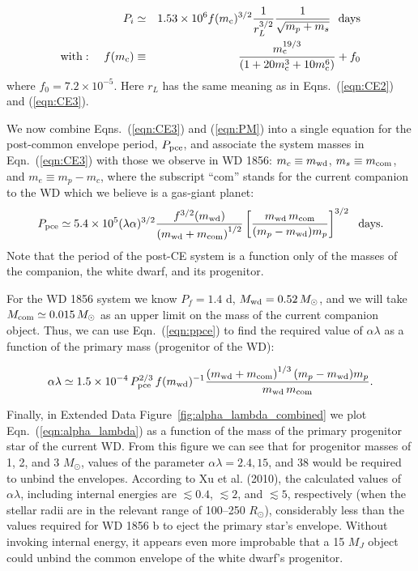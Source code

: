 \documentclass{nature3}
\begin{document}
\begin{methods}
\begin{eqnarray}
P_i  & \simeq & 1.53 \times 10^6 f(m_{\rm c})^{3/2}  \frac{1}{r_L^{3/2}}\frac{1}{\sqrt{m_p+m_s}} ~~{\rm days} \label{eqn:PM} \\
{\rm with:} ~~~~f(m_{\rm c}) & \equiv & \frac{m_{\rm c}^{19/3}}{(1+20m_{\rm c}^3 +10 m_{\rm c}^6)}+f_0  \nonumber
\label{eqn:pinit}
\end{eqnarray}
where $f_0 = 7.2\times 10^{-5}$.  Here $r_L$ has the same meaning as in Eqns.~(\ref{eqn:CE2}) and (\ref{eqn:CE3}).

We now combine Eqns.~(\ref{eqn:CE3}) and (\ref{eqn:PM}) into a single equation for the post-common envelope period, $P_{\rm pce}$, and associate the system masses in Eqn.~(\ref{eqn:CE3}) with those we observe in WD 1856: $m_c \equiv m_{\rm wd}$, $m_s \equiv m_{\rm com}$, and $m_e \equiv m_p - m_c$, where the subscript ``com'' stands for the current companion to the WD which we believe is a gas-giant planet: 
\begin{equation}
P_{\rm pce}  \simeq  5.4 \times 10^5 (\lambda \alpha)^{3/2}  \frac{f^{3/2}(m_{\rm wd})}{\left(m_{\rm wd}+m_{\rm com}\right)^{1/2}}
 \left[\frac{m_{\rm wd}\,m_{\rm com}}{(m_p-m_{\rm wd}) m_p}\right]^{3/2}    ~~{\rm days}.  
\label{eqn:ppce}
\end{equation}
Note that the period of the post-CE system is a function only of the masses of the companion, the white dwarf, and its progenitor.

For the WD 1856 system we know $P_f = 1.4$ d, $M_{\rm wd} = 0.52 \, M_\odot$, and we will take $M_{\rm com} \simeq 0.015 \,M_\odot$ as an upper limit on the mass of the current companion object. Thus, we can use Eqn.~(\ref{eqn:ppce}) to find the required value of $\alpha \lambda$ as a function of the primary mass (progenitor of the WD):

\begin{equation}
\alpha \lambda  \simeq  1.5 \times 10^{-4} \, P_{\rm pce}^{2/3} \,  f(m_{\rm wd})^{-1} \frac{\left(m_{\rm wd}+m_{\rm com}\right)^{1/3}  (m_p-m_{\rm wd}) m_p } { m_{\rm wd}\,m_{\rm com} }  .
\label{eqn:alpha_lambda}
\end{equation}


Finally, in Extended Data Figure~\ref{fig:alpha_lambda_combined} we plot Eqn.~(\ref{eqn:alpha_lambda}) as a function of the mass of the primary progenitor star of the current WD.  From this figure we can see that for progenitor masses of 1, 2, and 3 $M_\odot$, values of the parameter $\alpha \lambda = 2.4, 15$, and 38 would be required to unbind the envelopes.  According to Xu et al. (2010\cite{xu2010}), the calculated values of $\alpha \lambda$, including internal energies are $\lesssim 0.4$, $\lesssim 2$, and $\lesssim 5$, respectively (when the stellar radii are in the relevant range of 100--250 $R_\odot$), considerably less than the values required for WD 1856 b to eject the primary star's envelope. Without invoking internal energy, it appears even more improbable that a 15 $M_J$ object could unbind the common envelope of the white dwarf's progenitor.


\end{methods}
\end{document}
